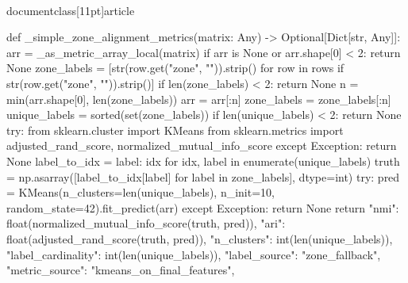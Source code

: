 \\documentclass[11pt]{article}
\begin{document}
\begin{CodeBlock}
    def _simple_zone_alignment_metrics(matrix: Any) -> Optional[Dict[str, Any]]:
        arr = _as_metric_array_local(matrix)
        if arr is None or arr.shape[0] < 2:
            return None
        zone_labels = [str(row.get("zone", "")).strip() for row in rows if str(row.get("zone", "")).strip()]
        if len(zone_labels) < 2:
            return None
        n = min(arr.shape[0], len(zone_labels))
        arr = arr[:n]
        zone_labels = zone_labels[:n]
        unique_labels = sorted(set(zone_labels))
        if len(unique_labels) < 2:
            return None
        try:
            from sklearn.cluster import KMeans
            from sklearn.metrics import adjusted_rand_score, normalized_mutual_info_score
        except Exception:
            return None
        label_to_idx = {label: idx for idx, label in enumerate(unique_labels)}
        truth = np.asarray([label_to_idx[label] for label in zone_labels], dtype=int)
        try:
            pred = KMeans(n_clusters=len(unique_labels), n_init=10, random_state=42).fit_predict(arr)
        except Exception:
            return None
        return {
            "nmi": float(normalized_mutual_info_score(truth, pred)),
            "ari": float(adjusted_rand_score(truth, pred)),
            "n_clusters": int(len(unique_labels)),
            "label_cardinality": int(len(unique_labels)),
            "label_source": "zone_fallback",
            "metric_source": "kmeans_on_final_features",
        }


\end{CodeBlock}
\end{document}
